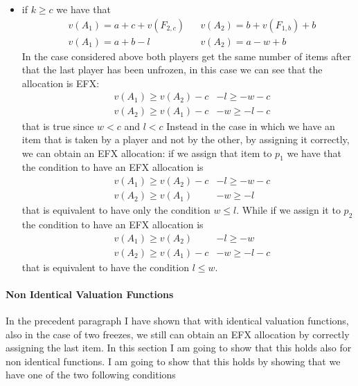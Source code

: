 \begin{itemize}
    \item if $k \ge c$ we have that
    \begin{align*}
        &v(A_1) = a + c + v(F_{2,c}) && v(A_2) = b + v(F_{1,b}) + b\\
        &v(A_1) = a + b-l && v(A_2) = a - w + b
    \end{align*}
    In the case considered above both players get the same number of items after that the last player has been unfrozen, in this case we can see that the allocation is EFX: 
    \begin{align*}
        &v(A_1) \ge v(A_2) -c & -l \ge - w - c\\
        &v(A_2) \ge v(A_1) -c & -w \ge -l -c
    \end{align*}
    that is true since $w<c$ and $l<c$
    Instead in the case in which we have an item that is taken by a player and not by the other, by assigning it correctly, we can obtain an EFX allocation: if we assign that item to $p_1$ we have that the condition to have an EFX allocation is
    \begin{align*}
        &v(A_1) \ge v(A_2) -c & -l \ge - w - c\\
        &v(A_2) \ge v(A_1) & -w \ge -l 
    \end{align*}
    that is equivalent to have only the condition $w\le l$.
    While if we assign it to $p_2$ the condition to have an EFX allocation is
    \begin{align*}
        &v(A_1) \ge v(A_2) & -l \ge - w\\
        &v(A_2) \ge v(A_1)-c & -w \ge -l -c
    \end{align*}
    that is equivalent to have the condition $l\le w$.
\end{itemize}

\paragraph{Non Identical Valuation Functions} 
In the precedent paragraph I have shown that with identical valuation functions, also in the case of two freezes, we still can obtain an EFX allocation by correctly assigning the last item. In this section I am going to show that this holds also for non identical functions.
I am going to show that this holds by showing that we have one of the two following conditions

